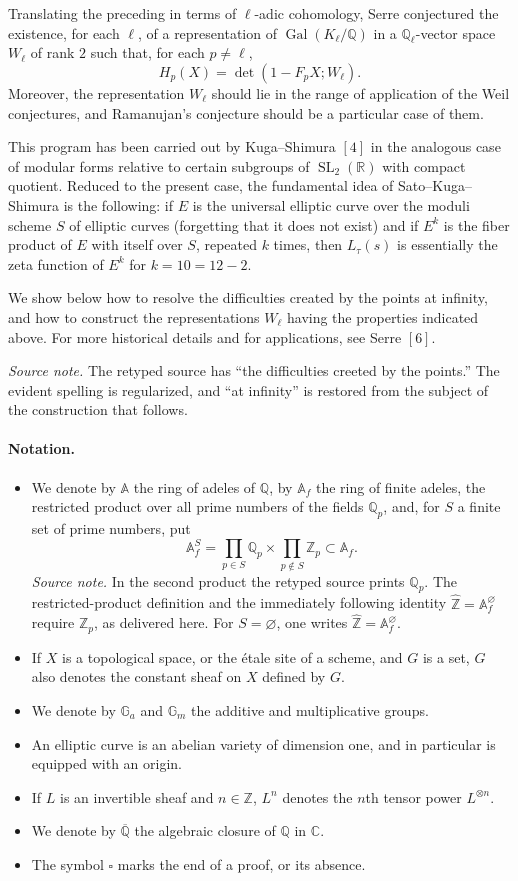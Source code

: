 \documentclass[10pt]{article}
\newcommand{\A}{\mathbb A}
\newcommand{\Af}{\mathbb A_f}
\newcommand{\C}{\mathbb C}
\newcommand{\Q}{\mathbb Q}
\newcommand{\R}{\mathbb R}
\newcommand{\Z}{\mathbb Z}
\newcommand{\bZ}{\widehat{\mathbb Z}}
\newcommand{\Ga}{\mathbb G_a}
\newcommand{\Gm}{\mathbb G_m}
\newcommand{\SL}{\operatorname{SL}}
\newcommand{\Gal}{\operatorname{Gal}}
\begin{document}
Translating the preceding in terms of $\ell$-adic cohomology, Serre conjectured the
existence, for each $\ell$, of a representation of $\Gal(K_\ell/\Q)$ in a $\Q_\ell$-vector
space $W_\ell$ of rank $2$ such that, for each $p\ne \ell$,
\[
H_p(X)=\det(1-F_pX;W_\ell).
\]
Moreover, the representation $W_\ell$ should lie in the range of application of the Weil
conjectures, and Ramanujan's conjecture should be a particular case of them.

This program has been carried out by Kuga--Shimura \([4]\) in the analogous case of
modular forms relative to certain subgroups of $\SL_2(\R)$ with compact quotient. Reduced
to the present case, the fundamental idea of Sato--Kuga--Shimura is the following: if
$E$ is the universal elliptic curve over the moduli scheme $S$ of elliptic curves (forgetting
that it does not exist) and if $E^k$ is the fiber product of $E$ with itself over $S$, repeated
$k$ times, then $L_\tau(s)$ is essentially the zeta function of $E^k$ for
$k=10=12-2$.

We show below how to resolve the difficulties created by the points at infinity, and how
to construct the representations $W_\ell$ having the properties indicated above. For more
historical details and for applications, see Serre \([6]\).

\noindent\emph{Source note.} The retyped source has ``the difficulties creeted by the
points.'' The evident spelling is regularized, and ``at infinity'' is restored from the
subject of the construction that follows.

\paragraph{Notation.}
\begin{itemize}
\item We denote by $\A$ the ring of adeles of $\Q$, by $\Af$ the ring of finite adeles, the
restricted product over all prime numbers of the fields $\Q_p$, and, for $S$ a finite set of
prime numbers, put
\[
\Af^S=\prod_{p\in S}\Q_p\times\prod_{p\notin S}\Z_p\subset \Af .
\]
\noindent\emph{Source note.} In the second product the retyped source prints $\Q_p$.
The restricted-product definition and the immediately following identity
$\widehat{\Z}=\Af^\varnothing$ require $\Z_p$, as delivered here.
For $S=\varnothing$, one writes $\bZ=\Af^\varnothing$.
\item If $X$ is a topological space, or the étale site of a scheme, and $G$ is a set, $G$ also
denotes the constant sheaf on $X$ defined by $G$.
\item We denote by $\Ga$ and $\Gm$ the additive and multiplicative groups.
\item An elliptic curve is an abelian variety of dimension one, and in particular is equipped
with an origin.
\item If $L$ is an invertible sheaf and $n\in\Z$, $L^n$ denotes the $n$th tensor power
$L^{\otimes n}$.
\item We denote by $\overline{\Q}$ the algebraic closure of $\Q$ in $\C$.
\item The symbol $\square$ marks the end of a proof, or its absence.
\end{itemize}
\end{document}
